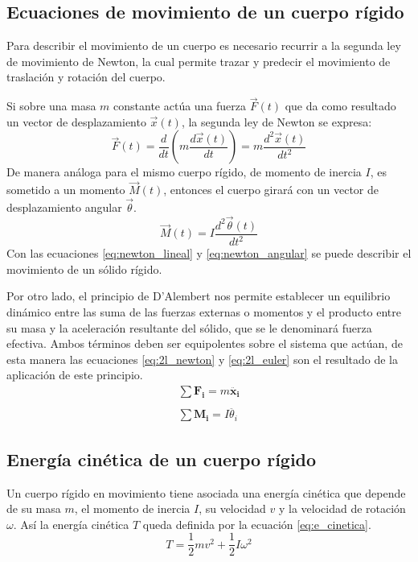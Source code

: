 \subsection{Ecuaciones de movimiento de un cuerpo rígido}
\label{sec:ec_mov}
Para describir el movimiento de un cuerpo es necesario recurrir a la segunda ley de movimiento de Newton, la cual permite trazar y predecir el movimiento de traslación y rotación del cuerpo.

Si sobre una masa $m$ constante actúa una fuerza $\vec{F}(t)$ que da como resultado un vector de desplazamiento $\vec{x}(t)$, la segunda ley de Newton se expresa:
\begin{equation}\label{eq:newton_lineal}
	\vec{F}(t) = \frac{d}{dt}\left(m\frac{d\vec{x}(t)}{dt}\right) = m \frac{d^2\vec{x}(t)}{dt^2}
\end{equation}
De manera análoga para el mismo cuerpo rígido, de momento de inercia $I$, es sometido a un momento $\vec{M}(t)$, entonces el cuerpo girará con un vector de desplazamiento angular $\vec{\theta}$.
\begin{equation}\label{eq:newton_angular}
	\vec{M}(t) = I\frac{d^2\vec{\theta}(t)}{dt^2}
\end{equation} 
Con las ecuaciones \ref{eq:newton_lineal} y \ref{eq:newton_angular} se puede describir el movimiento de un sólido rígido.

Por otro lado, el principio de D'Alembert nos permite establecer un equilibrio dinámico entre las suma de las fuerzas externas o momentos y el producto entre su masa y la aceleración resultante del sólido, que se le denominará fuerza efectiva. Ambos términos deben ser equipolentes sobre el sistema que actúan, de esta manera las ecuaciones \ref{eq:2l_newton} y \ref{eq:2l_euler} son el resultado de la aplicación de este principio.
\begin{gather}
	\sum \mathbf{F_i} = m\mathbf{\ddot{x_i}} \label{eq:2l_newton}\\
	\nonumber \\
	\sum \mathbf{M_i} = I\ddot{\theta_i} \label{eq:2l_euler}
\end{gather}

\subsection{Energía cinética de un cuerpo rígido}
Un cuerpo rígido en movimiento tiene asociada una energía cinética que depende de su masa $m$, el momento de inercia $I$, su velocidad $v$ y la velocidad de rotación $\omega$. Así la energía cinética $T$ queda definida por la ecuación \ref{eq:e_cinetica}.
\begin{equation}\label{eq:e_cinetica}
	T = \frac{1}{2}mv^2 + \frac{1}{2}I\omega^2 
\end{equation}


